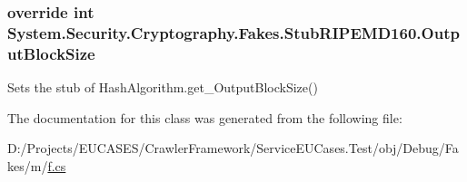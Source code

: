 \hypertarget{class_system_1_1_security_1_1_cryptography_1_1_fakes_1_1_stub_r_i_p_e_m_d160_aed5d56e9bc463c9170ed554079909b80}{
\subsubsection[{Output\-Block\-Size}]{\setlength{\rightskip}{0pt plus 5cm}override int System.\-Security.\-Cryptography.\-Fakes.\-Stub\-R\-I\-P\-E\-M\-D160.\-Output\-Block\-Size\hspace{0.3cm}{\ttfamily [get]}}}\label{class_system_1_1_security_1_1_cryptography_1_1_fakes_1_1_stub_r_i_p_e_m_d160_aed5d56e9bc463c9170ed554079909b80}


Sets the stub of Hash\-Algorithm.\-get\-\_\-\-Output\-Block\-Size()



The documentation for this class was generated from the following file\-:\begin{DoxyCompactItemize}
\item 
D\-:/\-Projects/\-E\-U\-C\-A\-S\-E\-S/\-Crawler\-Framework/\-Service\-E\-U\-Cases.\-Test/obj/\-Debug/\-Fakes/m/\hyperlink{m_2f_8cs}{f.\-cs}\end{DoxyCompactItemize}
